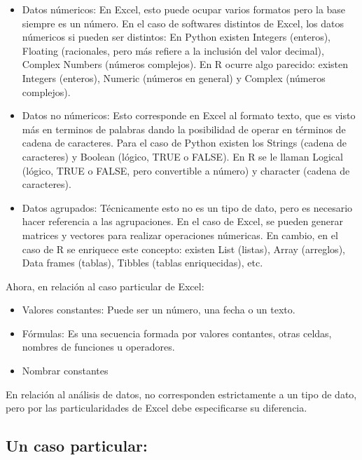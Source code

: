 \documentclass[12 pt,letterpaper]{article}
\begin{document}
\begin{itemize}
	
	\item Datos númericos: En Excel, esto puede ocupar varios formatos pero la base siempre es un número. En el caso de softwares distintos de Excel, los datos númericos si pueden ser distintos: En Python existen Integers (enteros), Floating (racionales, pero más refiere a la inclusión del valor decimal), Complex Numbers (números complejos). En R ocurre algo parecido: existen Integers (enteros), Numeric (números en general) y Complex (números complejos).
	
	\item Datos no númericos: Esto corresponde en Excel al formato texto, que es visto más en terminos de palabras dando la posibilidad de operar en términos de cadena de caracteres. Para el caso de Python existen los Strings (cadena de caracteres) y Boolean (lógico, TRUE o FALSE). En R se le llaman Logical (lógico, TRUE o FALSE, pero convertible a número) y character (cadena de caracteres).
	
	\item Datos agrupados: Técnicamente esto no es un tipo de dato, pero es necesario hacer referencia a las agrupaciones. En el caso de Excel, se pueden generar matrices y vectores para realizar operaciones númericas. En cambio, en el caso de R se enriquece este concepto: existen List (listas), Array (arreglos), Data frames (tablas), Tibbles (tablas enriquecidas), etc.	
	
\end{itemize}

Ahora, en relación al caso particular de Excel:
	
\begin{itemize}

	\item Valores constantes: Puede ser un número, una fecha o un texto.
	
	\item Fórmulas: Es una secuencia formada por valores contantes, otras celdas, nombres de funciones u operadores. 
	
	\item Nombrar constantes

\end{itemize}

En relación al análisis de datos, no corresponden estrictamente a un tipo de dato, pero por las particularidades de Excel debe especificarse su diferencia. 

\subsection{Un caso particular:}
\end{document}

